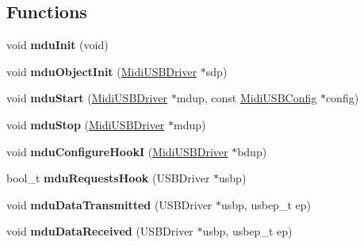 \subsection*{Functions}
\begin{DoxyCompactItemize}
\item 
void {\bfseries mdu\+Init} (void)\hypertarget{group__MIDI__USB_ga2d2a2f633a8def1c74bdab6f053d38a8}{}\label{group__MIDI__USB_ga2d2a2f633a8def1c74bdab6f053d38a8}

\item 
void {\bfseries mdu\+Object\+Init} (\hyperlink{structMidiUSBDriver}{Midi\+U\+S\+B\+Driver} $\ast$sdp)\hypertarget{group__MIDI__USB_ga65566847054076d2fcf500d668029683}{}\label{group__MIDI__USB_ga65566847054076d2fcf500d668029683}

\item 
void {\bfseries mdu\+Start} (\hyperlink{structMidiUSBDriver}{Midi\+U\+S\+B\+Driver} $\ast$mdup, const \hyperlink{structMidiUSBConfig}{Midi\+U\+S\+B\+Config} $\ast$config)\hypertarget{group__MIDI__USB_gaff47fcb0d75142c2290d6a55efde437e}{}\label{group__MIDI__USB_gaff47fcb0d75142c2290d6a55efde437e}

\item 
void {\bfseries mdu\+Stop} (\hyperlink{structMidiUSBDriver}{Midi\+U\+S\+B\+Driver} $\ast$mdup)\hypertarget{group__MIDI__USB_ga1a80a98e000a7dbd2860dc4e2f2d39f2}{}\label{group__MIDI__USB_ga1a80a98e000a7dbd2860dc4e2f2d39f2}

\item 
void {\bfseries mdu\+Configure\+HookI} (\hyperlink{structMidiUSBDriver}{Midi\+U\+S\+B\+Driver} $\ast$bdup)\hypertarget{group__MIDI__USB_ga0b39a0b3d906ed906a1fbc97fc16a21d}{}\label{group__MIDI__USB_ga0b39a0b3d906ed906a1fbc97fc16a21d}

\item 
bool\+\_\+t {\bfseries mdu\+Requests\+Hook} (U\+S\+B\+Driver $\ast$usbp)\hypertarget{group__MIDI__USB_ga8140cbee3ca097b4f93fc6c3384108c0}{}\label{group__MIDI__USB_ga8140cbee3ca097b4f93fc6c3384108c0}

\item 
void {\bfseries mdu\+Data\+Transmitted} (U\+S\+B\+Driver $\ast$usbp, usbep\+\_\+t ep)\hypertarget{group__MIDI__USB_ga2b7f696cfb953daa1bcc15acdc7a14f2}{}\label{group__MIDI__USB_ga2b7f696cfb953daa1bcc15acdc7a14f2}

\item 
void {\bfseries mdu\+Data\+Received} (U\+S\+B\+Driver $\ast$usbp, usbep\+\_\+t ep)\hypertarget{group__MIDI__USB_ga19dcb7baef4d31697a70a0e84382484d}{}\label{group__MIDI__USB_ga19dcb7baef4d31697a70a0e84382484d}


\end{DoxyCompactItemize}
